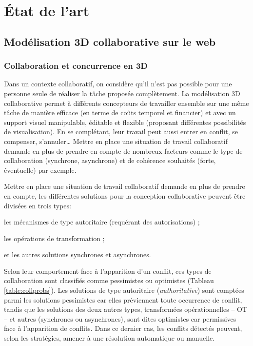 \chapter{État de l'art}
\chaptertable


\section{Modélisation 3D collaborative sur le web}

\subsection{Collaboration et concurrence en 3D}
\label{sec:concurrence}
Dans un contexte collaboratif, on considère qu'il n'est pas possible pour une 
personne seule de réaliser la tâche proposée complètement. 
La modélisation \gls{3D} collaborative permet à différents concepteurs de travailler 
ensemble sur une même tâche de manière efficace (en terme de coûts temporel et 
financier) et avec un support visuel manipulable, éditable et flexible (proposant 
différentes possibilités de visualisation). 
En se complétant, leur travail peut aussi entrer en conflit, se compenser, 
s'annuler\ldots
Mettre en place une situation de travail collaboratif demande en plus de prendre en compte de nombreux facteurs 
comme le type de collaboration (synchrone, asynchrone) et de cohérence souhaités 
(forte, éventuelle) par exemple.

Mettre en place une situation de travail collaboratif demande en plus de prendre en compte, les différentes solutions pour la conception collaborative peuvent être divisées en 
trois types: 
\begin{enumerate*}[label=(\roman*)]
	\item les mécanismes de type autoritaire (requérant des autorisations) ;
	\item les opérations de transformation ;
	\item et les autres solutions synchrones et asynchrones.
\end{enumerate*}
Selon leur comportement face à l'apparition d'un conflit, ces types de 
collaboration sont classifiés comme pessimistes ou optimistes (Tableau 
\ref{table:collprobs}). Les solutions de type autoritaire (\og \textit{authoritative}\fg{}) 
sont comptées parmi les solutions pessimistes car elles préviennent toute 
occurrence de conflit, tandis que les solutions des deux autres types,
transformées opérationnelles -- \gls{OT} -- et autres (synchrones ou asynchrones), 
sont dites optimistes car permissives face à l'apparition de conflits. 
Dans ce dernier cas, les conflits détectés peuvent, selon les stratégies, amener à 
une résolution automatique ou manuelle.

